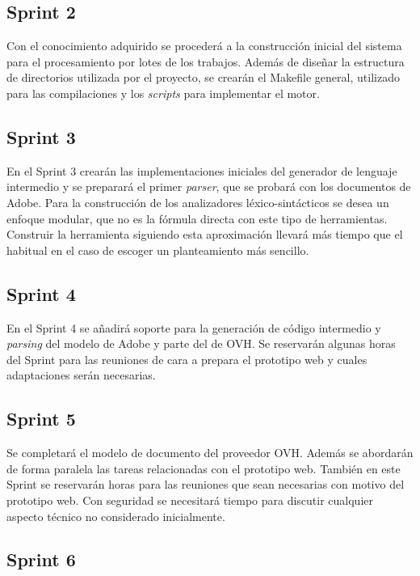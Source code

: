 \subsection{Sprint 2}

Con el conocimiento adquirido se procederá a la construcción inicial del sistema para el procesamiento por lotes de los trabajos. Además de diseñar la estructura de directorios utilizada por el proyecto, se crearán el Makefile general, utilizado para las compilaciones y los \emph{scripts} para implementar el motor.

\subsection{Sprint 3}

En el Sprint 3 crearán las implementaciones iniciales del generador de lenguaje intermedio y se preparará el primer \emph{parser}, que se probará con los documentos de Adobe. Para la construcción de los analizadores léxico-sintácticos se desea un enfoque modular, que no es la fórmula directa con este tipo de herramientas. Construir la herramienta siguiendo esta aproximación llevará más tiempo que el habitual en el caso de escoger un planteamiento más sencillo.

\subsection{Sprint 4}

En el Sprint 4 se añadirá soporte para la generación de código intermedio y \emph{parsing} del modelo de Adobe y parte del de OVH. Se reservarán algunas horas del Sprint para las reuniones de cara a prepara el prototipo web y cuales adaptaciones serán necesarias.

\subsection{Sprint 5}

Se completará el modelo de documento del proveedor OVH. Además se abordarán de forma paralela las tareas relacionadas con el prototipo web. También en este Sprint se reservarán horas para las reuniones que sean necesarias con motivo del prototipo web. Con seguridad se necesitará tiempo para discutir cualquier aspecto técnico no considerado inicialmente.

\subsection{Sprint 6}

